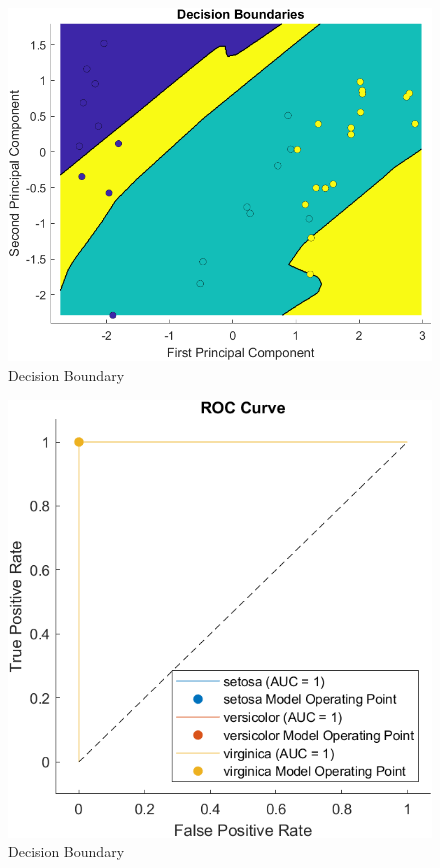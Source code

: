 \documentclass[conference]{inc/IEEEtran}
\begin{document}
  \begin{figure}
    \includegraphics[width=\linewidth]{figures/DB.png}
    \caption{Decision Boundary}
    \label{fig:boat1}
  \end{figure}

  \begin{figure}
    \includegraphics[width=\linewidth]{figures/roc.png}
    \caption{Decision Boundary}
    \label{fig:boat1}
  \end{figure}
\end{document}
